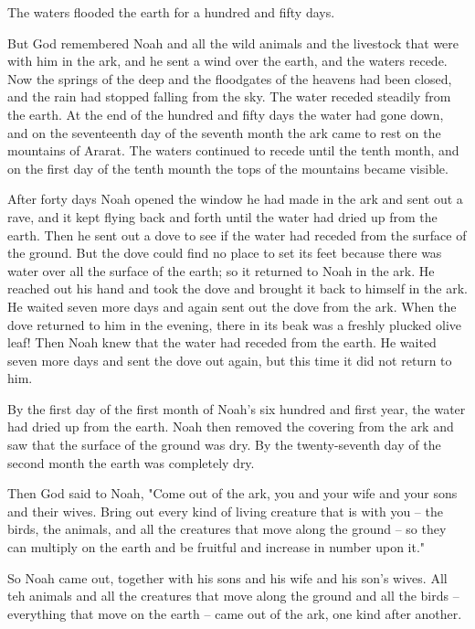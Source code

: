 \V The waters flooded the earth for a hundred and fifty days.

\C But God remembered Noah and all the wild animals and the livestock that were
with him in the ark, and he sent a wind over the earth, and the waters recede.
\V Now the springs of the deep and the floodgates of the heavens had been
closed, and the rain had stopped falling from the sky. \V The water receded
steadily from the earth. At the end of the hundred and fifty days the water had
gone down, \V and on the seventeenth day of the seventh month the ark came to
rest on the mountains of Ararat. \V The waters continued to recede until the
tenth month, and on the first day of the tenth mounth the tops of the mountains
became visible.

\V After forty days Noah opened the window he had made in the ark \V and sent
out  a rave, and it kept flying back and forth until the water had dried up from
the earth. \V Then he sent out a dove to see if the water had receded from the
surface of the ground. \V But the dove could find no place to set its feet
because there was water over all the surface of the earth; so it returned to
Noah in the ark. He reached out his hand and took the dove and brought it back
to himself in the ark. \V He waited seven more days and again sent out the dove
from the ark. \V When the dove returned to him in the evening, there in its beak
was a freshly plucked olive leaf! Then Noah knew that the water had receded from
the earth. \V He waited seven more days and sent the dove out again, but this
time it did not return to him.

\V By the first day of the first month of Noah's six hundred and first year, the
water had dried up from the earth. Noah then removed the covering from the ark
and saw that the surface of the ground was dry. \V By the twenty-seventh day of
the second month the earth was completely dry.

\V Then God said to Noah, \V "Come out of the ark, you and your wife and your
sons and their wives. \V Bring out every kind of living creature that is with
you -- the birds, the animals, and all the creatures that move along the ground
-- so they can multiply on the earth and be fruitful and increase in number upon
it."

\V So Noah came out, together with his sons and his wife and his son's wives. \V
All teh animals and all the creatures that move along the ground and all the
birds -- everything that move on the earth -- came out of the ark, one kind
after another.

